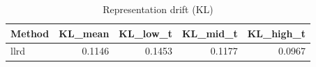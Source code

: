\begin{table}[htbp]
\centering
\caption{Representation drift (KL)}
\label{tab:repr-drift}
\begin{tabular}{lrrrr}
\toprule
\textbf{Method} & \textbf{KL\_mean} & \textbf{KL\_low\_t} & \textbf{KL\_mid\_t} & \textbf{KL\_high\_t} \\
\midrule
llrd & 0.1146 & 0.1453 & 0.1177 & 0.0967 \\
\bottomrule
\end{tabular}
\end{table}
